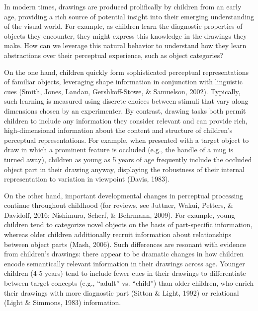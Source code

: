 \documentclass[10pt, letterpaper]{article}
\begin{document}
In modern times, drawings are produced prolifically by children from an
early age, providing a rich source of potential insight into their
emerging understanding of the visual world. For example, as children
learn the diagnostic properties of objects they encounter, they might
express this knowledge in the drawings they make. How can we leverage
this natural behavior to understand how they learn abstractions over
their perceptual experience, such as object categories?

On the one hand, children quickly form sophisticated perceptual
representations of familiar objects, leveraging shape information in
conjunction with linguistic cues (Smith, Jones, Landau, Gershkoff-Stowe,
\& Samuelson, 2002). Typically, such learning is measured using discrete
choices between stimuli that vary along dimensions chosen by an
experimenter. By contrast, drawing tasks both permit children to include
any information they consider relevant and can provide rich,
high-dimensional information about the content and structure of
children's perceptual representations. For example, when presented with
a target object to draw in which a prominent feature is occluded (e.g.,
the handle of a mug is turned away), children as young as 5 years of age
frequently include the occluded object part in their drawing anyway,
displaying the robustness of their internal representation to variation
in viewpoint (Davis, 1983).

On the other hand, important developmental changes in perceptual
processing continue throughout childhood (for reviews, see Juttner,
Wakui, Petters, \& Davidoff, 2016; Nishimura, Scherf, \& Behrmann,
2009). For example, young children tend to categorize novel objects on
the basis of part-specific information, whereas older children
additionally recruit information about relationships between object
parts (Mash, 2006). Such differences are resonant with evidence from
children's drawings: there appear to be dramatic changes in how children
encode semantically relevant information in their drawings across age.
Younger children (4-5 years) tend to include fewer cues in their
drawings to differentiate between target concepts (e.g., ``adult'' vs.
``child'') than older children, who enrich their drawings with more
diagnostic part (Sitton \& Light, 1992) or relational (Light \& Simmons,
1983) information.
\end{document}
